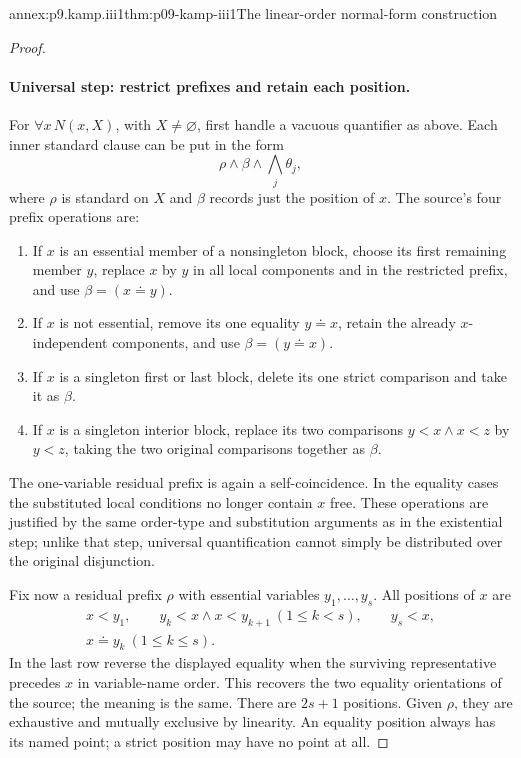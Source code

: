 \begin{annexitem}{annex:p9.kamp.iii1}{thm:p09-kamp-iii1}{The linear-order normal-form construction}
\begin{proof}
\paragraph{Universal step: restrict prefixes and retain each position.}
For \(\forall x\,N(x,X)\), with \(X\ne\varnothing\), first handle a
vacuous quantifier as above.  Each inner standard clause can be put in the
form
\[
 \rho\land\beta\land\bigwedge_j\theta_j,
\]
where \(\rho\) is standard on \(X\) and \(\beta\) records just the
position of \(x\).  The source's four prefix operations are:

\begin{enumerate}
\item If \(x\) is an essential member of a nonsingleton block, choose its
      first remaining member \(y\), replace \(x\) by \(y\) in all local
      components and in the restricted prefix, and use
      \(\beta=(x\doteq y)\).
\item If \(x\) is not essential, remove its one equality
      \(y\doteq x\), retain the already \(x\)-independent components,
      and use \(\beta=(y\doteq x)\).
\item If \(x\) is a singleton first or last block, delete its one strict
      comparison and take it as \(\beta\).
\item If \(x\) is a singleton interior block, replace its two comparisons
      \(y<x\land x<z\) by \(y<z\), taking the two original comparisons
      together as \(\beta\).
\end{enumerate}
The one-variable residual prefix is again a self-coincidence.  In the
equality cases the substituted local conditions no longer contain \(x\)
free.  These operations are justified by the same order-type and substitution
arguments as in the existential step; unlike that step, universal
quantification cannot simply be distributed over the original disjunction.

Fix now a residual prefix \(\rho\) with essential variables
\(y_1,\ldots,y_s\).  All positions of \(x\) are
\[
\begin{gathered}
 x<y_1,\qquad y_k<x\land x<y_{k+1}\ (1\leq k<s),
 \qquad y_s<x,\\
 x\doteq y_k\ (1\leq k\leq s).
\end{gathered}
\]
In the last row reverse the displayed equality when the surviving
representative precedes \(x\) in variable-name order.  This recovers the
two equality orientations of the source; the meaning is the same.
There are \(2s+1\) positions.  Given \(\rho\), they are exhaustive
and mutually exclusive by linearity.  An equality position always has its
named point; a strict position may have no point at all.


\end{proof}
\end{annexitem}
